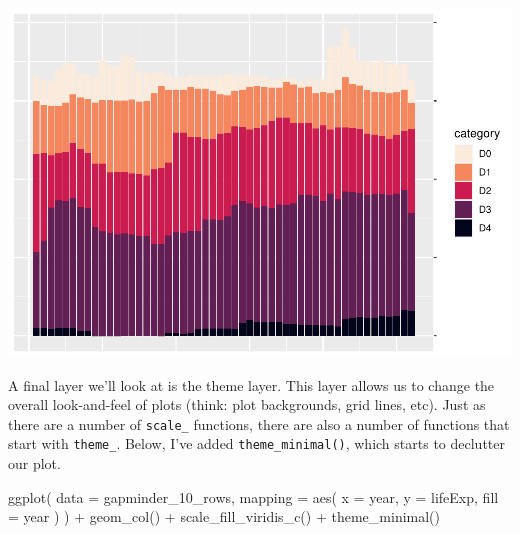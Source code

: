 \documentclass[
]{book}
\newenvironment{Shaded}{\begin{snugshade}}{\end{snugshade}}
\newcommand{\AttributeTok}[1]{\textcolor[rgb]{0.77,0.63,0.00}{#1}}
\newcommand{\FunctionTok}[1]{\textcolor[rgb]{0.00,0.00,0.00}{#1}}
\newcommand{\NormalTok}[1]{#1}
\newcommand{\SpecialCharTok}[1]{\textcolor[rgb]{0.00,0.00,0.00}{#1}}
\begin{document}
\includegraphics[width=1\linewidth]{data-viz_files/figure-latex/unnamed-chunk-22-1}

A final layer we'll look at is the theme layer. This layer allows us to change the overall look-and-feel of plots (think: plot backgrounds, grid lines, etc). Just as there are a number of \texttt{scale\_} functions, there are also a number of functions that start with \texttt{theme\_}. Below, I've added \texttt{theme\_minimal()}, which starts to declutter our plot.

\begin{Shaded}
\begin{Highlighting}[]
\FunctionTok{ggplot}\NormalTok{(}
  \AttributeTok{data =}\NormalTok{ gapminder\_10\_rows,}
  \AttributeTok{mapping =} \FunctionTok{aes}\NormalTok{(}
    \AttributeTok{x =}\NormalTok{ year,}
    \AttributeTok{y =}\NormalTok{ lifeExp,}
    \AttributeTok{fill =}\NormalTok{ year}
\NormalTok{  )}
\NormalTok{) }\SpecialCharTok{+}
  \FunctionTok{geom\_col}\NormalTok{() }\SpecialCharTok{+}
  \FunctionTok{scale\_fill\_viridis\_c}\NormalTok{() }\SpecialCharTok{+}
  \FunctionTok{theme\_minimal}\NormalTok{()}
\end{Highlighting}
\end{Shaded}
\end{document}
